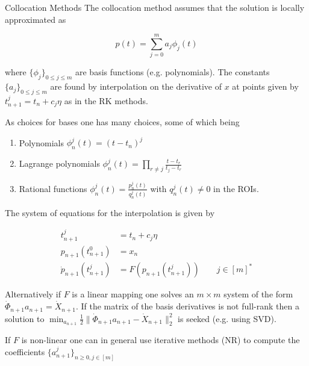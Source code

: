 \documentclass[10pt]{beamer}
\begin{document}
\begin{frame}[allowframebreaks]{Collocation Methods}
    The collocation method assumes that the solution is locally approximated as 
    
    \begin{equation}
        p(t) = \sum_{j = 0}^m a_j \phi_j(t)
    \end{equation}

    where $\{ \phi_j \}_{0 \le j \le m}$ are basis functions (e.g. polynomials). 
    The constants $ \{ a_j \}_{0 \le j \le m}$ are found by interpolation on the derivative of $x$ at points given by $t_{n + 1}^j = t_n + c_j \eta$ as in the RK methods. 
    
    As choices for bases one has many choices, some of which being
    
    \begin{enumerate}
        \item Polynomials $\phi_n^j(t) = (t - t_n)^j$ 
        \item Lagrange polynomials $\phi_n^j(t) = \prod_{r \neq j} \frac {t - t_r} {t_j - t_r}$
        \item Rational functions $\phi_n^j(t) = \frac {p_n^j(t)} {q_n^j(t)}$ with $q_n^j (t) \neq 0$ in the ROIs. 
     \end{enumerate}

    
    \framebreak
    
    The system of equations for the interpolation is given by 
    
    \begin{align*}
        t_{n + 1}^j &= t_n + c_j \eta \\
        p_{n + 1} (t_{n + 1}^0) & = x_n \\
        \dot p_{n + 1} (t_{n + 1}^j) & = F(p_{n + 1}(t_{n + 1}^j)) \qquad j \in [m]^*
    \end{align*}

    Alternatively if $F$ is a linear mapping one solves an $m \times m$ system of the form $\dot \Phi_{n + 1} a_{n+1} = \dot X_{n + 1}$. If the matrix of the basis derivatives is not full-rank then a solution to $\min_{a_{n + 1}} \frac 1 2  \| \dot \Phi_{n + 1} a_{n+1} - \dot X_{n + 1}  \|_2^2$ is seeked (e.g. using SVD).

    \medskip
    
    If $F$ is non-linear one can in general use iterative methods (NR) to compute the coefficients $ \{ a_{n + 1}^j \}_{n \ge 0, j \in [m]}$


\end{frame}
\end{document}

